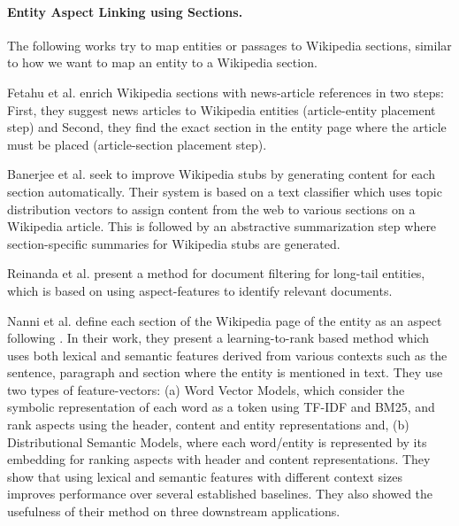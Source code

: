 \paragraph{\textbf{Entity Aspect Linking using Sections.}} 
The following works try to map entities or passages to Wikipedia sections, similar to how we want to map an entity to a Wikipedia section.

Fetahu et al. \cite{fetahu2015automated} enrich Wikipedia sections with news-article references in two steps: First, they suggest news articles to Wikipedia entities (article-entity placement step) and Second, they find the exact section in the entity page where the article must be placed (article-section placement step).

Banerjee et al. \cite{banerjee2015wikikreator} seek to improve Wikipedia stubs by generating content for each section automatically. Their system is based on a text classifier which uses topic distribution vectors to assign content from the web to various sections on a Wikipedia article. This is followed by an abstractive summarization step where section-specific summaries for Wikipedia stubs are generated.

Reinanda et al. \cite{reinanda2016document} present a method for document filtering for long-tail entities, which is based on using aspect-features to identify relevant documents. 

Nanni et al. \cite{nanni2018entity} define each section of the Wikipedia page of the entity as an aspect following \cite{fetahu2015automated,banerjee2015wikikreator,reinanda2016document}.
In their work, they present a learning-to-rank based method which uses both lexical and semantic features derived from various contexts such as the sentence, paragraph and section where the entity is mentioned in text. They use two types of feature-vectors: (a) Word Vector Models, which consider the symbolic representation of each word as a token using TF-IDF and BM25, and rank aspects using the header, content and entity representations and, (b) Distributional Semantic Models, where each word/entity is represented by its embedding for ranking aspects with header and content representations. They show that using lexical and semantic features with different context sizes improves performance over several established baselines. They also showed the usefulness of their method on three downstream applications.  



